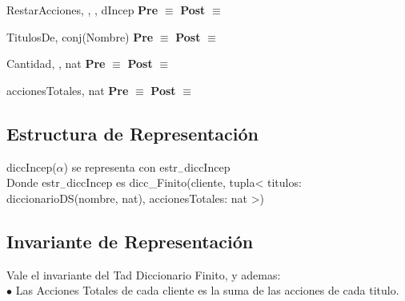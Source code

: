 	\begin{interfaz}{RestarAcciones}{, , , }{dIncep}{}
	\textbf{Pre} $\equiv$ 
	\textbf{Post} $\equiv$ 
	\end{interfaz}
	
	\begin{interfaz}{TitulosDe}{, }{conj(Nombre)}{}
	\textbf{Pre} $\equiv$ 
	\textbf{Post} $\equiv$ 
	\end{interfaz}	
	
	\begin{interfaz}{Cantidad}{, , }{nat}{}
	\textbf{Pre} $\equiv$ 
	\textbf{Post} $\equiv$ 
	\end{interfaz}
	
		\begin{interfaz}{accionesTotales}{, }{nat}{}
	\textbf{Pre} $\equiv$ 
	\textbf{Post} $\equiv$ 
	\end{interfaz}
	
	
	
\subsection{Estructura de Representaci\'on}
	diccIncep($\alpha$) se representa con estr$_-$diccIncep\\
	Donde estr$_-$diccIncep es dicc\_Finito(cliente, tupla<
													titulos:	diccionarioDS(nombre, nat),
													accionesTotales:	nat
													>)\\
	
	
\subsection{Invariante de Representaci\'on}

Vale el invariante del Tad Diccionario Finito, y ademas: \\
$\bullet$ Las Acciones Totales de cada cliente es la suma de las acciones de cada titulo. \\


